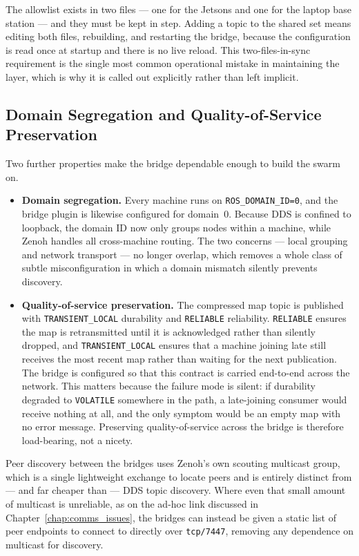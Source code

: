\begin{notebox}
The allowlist exists in two files --- one for the Jetsons and one for the laptop base station --- and they must be kept in step. Adding a topic to the shared set means editing both files, rebuilding, and restarting the bridge, because the configuration is read once at startup and there is no live reload. This two-files-in-sync requirement is the single most common operational mistake in maintaining the layer, which is why it is called out explicitly rather than left implicit.
\end{notebox}

\subsection{Domain Segregation and Quality-of-Service Preservation}
\label{subsec:domain_qos}

Two further properties make the bridge dependable enough to build the swarm on.

\begin{itemize}
    \item \textbf{Domain segregation.} Every machine runs on \texttt{ROS\_DOMAIN\_ID=0}, and the bridge plugin is likewise configured for domain~0. Because DDS is confined to loopback, the domain ID now only groups nodes within a machine, while Zenoh handles all cross-machine routing. The two concerns --- local grouping and network transport --- no longer overlap, which removes a whole class of subtle misconfiguration in which a domain mismatch silently prevents discovery.
    \item \textbf{Quality-of-service preservation.} The compressed map topic is published with \texttt{TRANSIENT\_LOCAL} durability and \texttt{RELIABLE} reliability. \texttt{RELIABLE} ensures the map is retransmitted until it is acknowledged rather than silently dropped, and \texttt{TRANSIENT\_LOCAL} ensures that a machine joining late still receives the most recent map rather than waiting for the next publication. The bridge is configured so that this contract is carried end-to-end across the network. This matters because the failure mode is silent: if durability degraded to \texttt{VOLATILE} somewhere in the path, a late-joining consumer would receive nothing at all, and the only symptom would be an empty map with no error message. Preserving quality-of-service across the bridge is therefore load-bearing, not a nicety.
\end{itemize}

Peer discovery between the bridges uses Zenoh's own scouting multicast group, which is a single lightweight exchange to locate peers and is entirely distinct from --- and far cheaper than --- DDS topic discovery. Where even that small amount of multicast is unreliable, as on the ad-hoc link discussed in Chapter~\ref{chap:comms_issues}, the bridges can instead be given a static list of peer endpoints to connect to directly over \texttt{tcp/7447}, removing any dependence on multicast for discovery.

